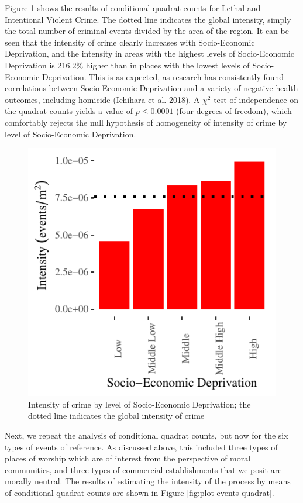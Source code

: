\documentclass[smallextended]{svjour3}       %
\begin{document}
Figure \ref{fig:plot-crime-quadrat} shows the results of conditional
quadrat counts for Lethal and Intentional Violent Crime. The dotted line
indicates the global intensity, simply the total number of criminal
events divided by the area of the region. It can be seen that the
intensity of crime clearly increases with Socio-Economic Deprivation,
and the intensity in areas with the highest levels of Socio-Economic
Deprivation is 216.2\% higher than in places with the lowest levels of
Socio-Economic Deprivation. This is as expected, as research has
consistently found correlations between Socio-Economic Deprivation and a
variety of negative health outcomes, including homicide (Ichihara et al.
2018). A \(\chi^2\) test of independence on the quadrat counts yields a
value of \(p\leq 0.0001\) (four degrees of freedom), which comfortably
rejects the null hypothesis of homogeneity of intensity of crime by
level of Socio-Economic Deprivation.

\begin{figure}
\centering
\includegraphics{Moral_Communities_and_Crime_files/figure-latex/plot-crime-quadrat-1.pdf}
\caption{\label{fig:plot-crime-quadrat}Intensity of crime by level of
Socio-Economic Deprivation; the dotted line indicates the global
intensity of crime}
\end{figure}

Next, we repeat the analysis of conditional quadrat counts, but now for
the six types of events of reference. As discussed above, this included
three types of places of worship which are of interest from the
perspective of moral communities, and three types of commercial
establishments that we posit are morally neutral. The results of
estimating the intensity of the process by means of conditional quadrat
counts are shown in Figure \ref{fig:plot-events-quadrat}.
\end{document}
